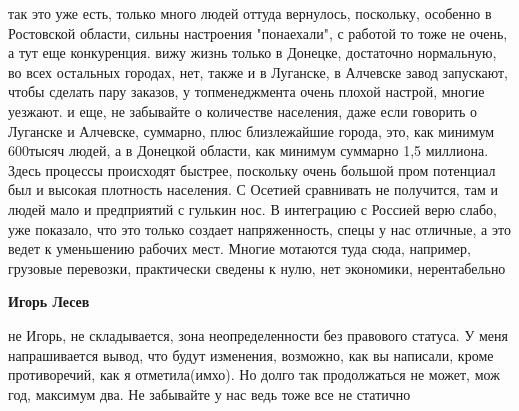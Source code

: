 \begin{itemize}
\begin{itemize}
так это уже есть, только много людей оттуда вернулось, поскольку, особенно в
Ростовской области, сильны настроения "понаехали", с работой то тоже не очень,
а тут еще конкуренция. вижу жизнь только в Донецке, достаточно нормальную, во
всех остальных городах, нет, также и в Луганске, в Алчевске завод запускают,
чтобы сделать пару заказов, у топменеджмента очень плохой настрой, многие
уезжают. и еще, не забывайте о количестве населения, даже если говорить о
Луганске и Алчевске, суммарно, плюс близлежайшие города, это, как минимум
600тысяч людей, а в Донецкой области, как минимум суммарно 1,5 миллиона. Здесь
процессы происходят быстрее, поскольку очень большой пром потенциал был и
высокая плотность населения. С Осетией сравнивать не получится, там и людей
мало и предприятий с гулькин нос. В интеграцию с Россией верю слабо, уже
показало, что это только создает напряженность, спецы у нас отличные, а это
ведет к уменьшению рабочих мест. Многие мотаются туда сюда, например, грузовые
перевозки, практически сведены к нулю, нет экономики, нерентабельно

\textbf{Игорь Лесев} 

не Игорь, не складывается, зона неопределенности без правового статуса. У меня
напрашивается вывод, что будут изменения, возможно, как вы написали, кроме
противоречий, как я отметила(имхо). Но долго так продолжаться не может, мож
год, максимум два. Не забывайте у нас ведь тоже все не статично

\end{itemize} %

\end{itemize} %

